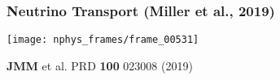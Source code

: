 \documentclass[]{beamer}
\begin{document}


\begin{frame}
  \frametitle{Neutrino Transport (Miller et al., 2019)}
  \begin{center}
    \texttt{[image: nphys\_frames/frame\_00531]}
  \end{center}
  \begin{tiny}
    \textbf{JMM} et al. PRD \textbf{100} 023008 (2019)
  \end{tiny}
\end{frame}
\end{document}
